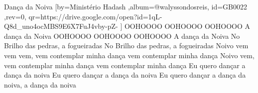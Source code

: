 \beginsong
{Dança da Noiva %
}[by={Ministério Hadash %
},album={@walyssondosreis},
id={GB0022 %
},rev={0}, %
qr={https://drive.google.com/open?id=1qL-Q8d_uno4ocMBS9E6X7FuJ4vby-pZ- %
}]
\beginverse*
OOHOOOO OOHOOOO OOHOOOO A dança da Noiva
OOHOOOO OOHOOOO OOHOOOO A dança da Noiva
\endverse
\beginverse*
No Brilho das pedras, a fogueiradas
No Brilho das pedras, a fogueiradas
\endverse
\beginverse*
Noivo vem vem vem, vem contemplar minha dança
vem contemplar minha dança
Noivo vem, vem contemplar minha dança
vem contemplar minha dança
\endverse
\beginchorus
Eu quero dançar a dança da noiva
Eu quero dançar a dança da noiva
Eu quero dançar a dança da noiva, a dança da noiva
\endchorus
\vspace{4em} %
\begin{comment}
\lstset{basicstyle=\scriptsize\bf} %
\tab{Solo 1}
\begin{lstlisting}
E|-----------------------------------------------------|
B|-----------------------------------------------------|
G|-----------------------------------------------------|
D|-----------------------------------------------------|
A|-----------------------------------------------------|
E|-----------------------------------------------------|
\end{lstlisting}
\end{comment}
 
